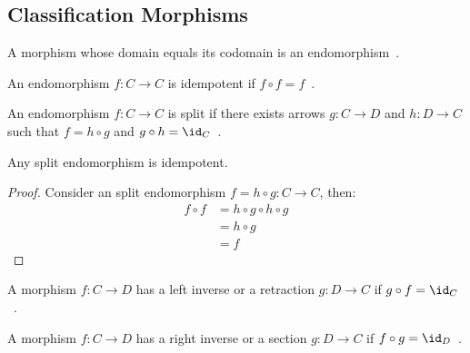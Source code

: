 \subsection{Classification Morphisms}

\begin{definition}[Endomorphism]
  A morphism whose domain equals its codomain is an
  endomorphism~\parencite[p.~7]{riehl:category_theory_in_context}.
\end{definition}

\begin{definition}[Idempotent]
  An endomorphism $f:C\to C$ is idempotent if $f\circ f =
  f$~\parencite[p.~20]{lane:working_mathematician}.
\end{definition}

\begin{definition}[Split]
  An endomorphism $f:C\to C$ is split if there exists arrows $g:C\to D$ and
  $h:D\to C$ such that $f=h\circ g$ and $g\circ h=
  \id_{C}$~\parencite[p.~20]{lane:working_mathematician}.
\end{definition}

\begin{theorem}
  Any split endomorphism is idempotent.

  \begin{proof}
    Consider an split endomorphism $f=h\circ g:C\to C$, then:
    \[
      \begin{aligned}
        f\circ f &= h\circ g \circ h\circ g\\
        &= h\circ g\\
        &= f
      \end{aligned}
    \]
  \end{proof}
  \vspace{-\baselineskip}
\end{theorem}

\begin{definition}
  A morphism $f: C\to D$ has a left inverse or a retraction $g: D\to C$ if
  $g\circ f = \id_C$~\parencite[p.~19]{lane:working_mathematician}.
\end{definition}

\begin{definition}
  A morphism $f: C\to D$ has a right inverse or a section $g: D\to C$ if
  $f\circ g = \id_{D}$~\parencite[p.~19]{lane:working_mathematician}.
\end{definition}

